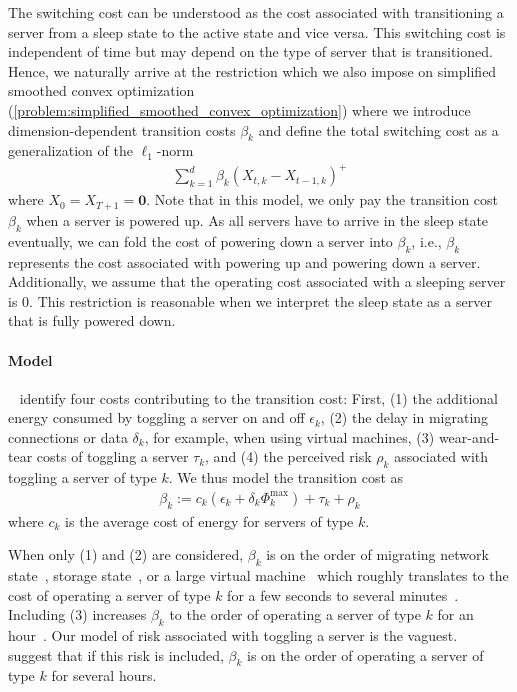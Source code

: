 The switching cost can be understood as the cost associated with transitioning a server from a sleep state to the active state and vice versa. This switching cost is independent of time but may depend on the type of server that is transitioned. Hence, we naturally arrive at the restriction which we also impose on simplified smoothed convex optimization (\cref{problem:simplified_smoothed_convex_optimization}) where we introduce dimension-dependent transition costs $\beta_k$ and define the total switching cost as a generalization of the $\ell_1$-norm \begin{align*}
    \sum_{k=1}^d \beta_k (X_{t,k} - X_{t-1,k})^+
\end{align*} where $X_0 = X_{T+1} = \mathbf{0}$. Note that in this model, we only pay the transition cost $\beta_k$ when a server is powered up. As all servers have to arrive in the sleep state eventually, we can fold the cost of powering down a server into $\beta_k$, i.e., $\beta_k$ represents the cost associated with powering up and powering down a server. Additionally, we assume that the operating cost associated with a sleeping server is $0$. This restriction is reasonable when we interpret the sleep state as a server that is fully powered down.

\paragraph{Model} \citeauthor*{Lin2011}~\cite{Lin2011} identify four costs contributing to the transition cost: First, (1) the additional energy consumed by toggling a server on and off $\epsilon_k$, (2) the delay in migrating connections or data $\delta_k$, for example, when using virtual machines, (3) wear-and-tear costs of toggling a server $\tau_k$, and (4) the perceived risk $\rho_k$ associated with toggling a server of type $k$. We thus model the transition cost as \begin{align*}
    \beta_k := c_k(\epsilon_k + \delta_k \Phi_k^{\text{max}}) + \tau_k + \rho_k
\end{align*} where $c_k$ is the average cost of energy for servers of type $k$.

When only (1) and (2) are considered, $\beta_k$ is on the order of migrating network state~\cite{Chen2008}, storage state~\cite{Thereska2009}, or a large virtual machine~\cite{Clark2005} which roughly translates to the cost of operating a server of type $k$ for a few seconds to several minutes~\cite{Lin2011}. Including (3) increases $\beta_k$ to the order of operating a server of type $k$ for an hour~\cite{Bodik2008}. Our model of risk associated with toggling a server is the vaguest. \citeauthor*{Lin2011}~\cite{Lin2011} suggest that if this risk is included, $\beta_k$ is on the order of operating a server of type $k$ for several hours.

